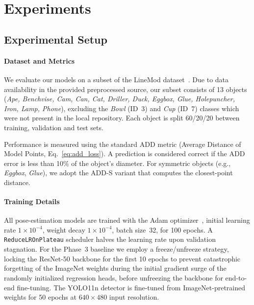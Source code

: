 \section{Experiments}
\label{sec:experiments}

\subsection{Experimental Setup}
\label{sec:exp_setup}

\paragraph{Dataset and Metrics}
We evaluate our models on a subset of the LineMod dataset~\cite{hinterstoisser2012model}. Due to data availability in the provided preprocessed source, our subset consists of 13 objects (\textit{Ape, Benchvise, Cam, Can, Cat, Driller, Duck, Eggbox, Glue, Holepuncher, Iron, Lamp, Phone}), excluding the \textit{Bowl} (ID~3) and \textit{Cup} (ID~7) classes which were not present in the local repository. Each object is split 60/20/20 between training, validation and test sets.

Performance is measured using the standard ADD metric (Average Distance of Model Points, Eq.~\ref{eq:add_loss}). A prediction is considered correct if the ADD error is less than 10\% of the object's diameter. For symmetric objects (e.g., \textit{Eggbox}, \textit{Glue}), we adopt the ADD-S variant that computes the closest-point distance.

\paragraph{Training Details}
All pose-estimation models are trained with the Adam optimizer~\cite{kingma2014adam}, initial learning rate $1\!\times\!10^{-4}$, weight decay $1\!\times\!10^{-4}$, batch size~32, for 100 epochs. A \texttt{ReduceLROnPlateau} scheduler halves the learning rate upon validation stagnation. For the Phase~3 baseline we employ a freeze/unfreeze strategy, locking the ResNet-50 backbone for the first 10 epochs to prevent catastrophic forgetting of the ImageNet weights during the initial gradient surge of the randomly initialized regression heads, before unfreezing the backbone for end-to-end fine-tuning. The YOLO11n detector is fine-tuned from ImageNet-pretrained weights for 50 epochs at $640\!\times\!480$ input resolution.

